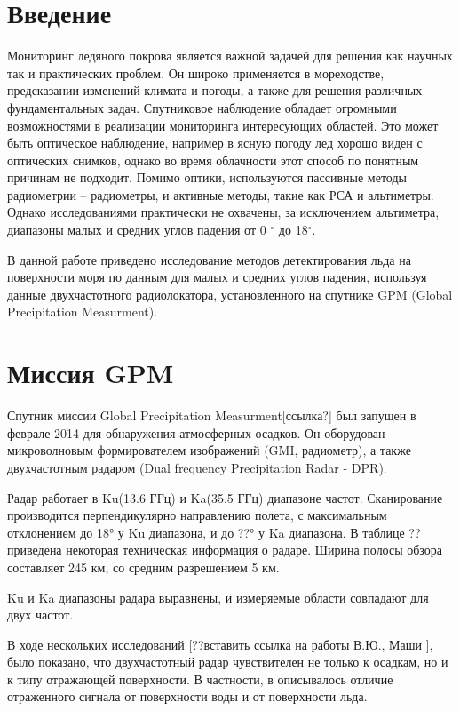 





\tableofcontents
\newpage
\section{Введение}

Мониторинг ледяного покрова является важной задачей для решения как научных так и практических проблем. Он широко
применяется в мореходстве, предсказании изменений климата и погоды, а также для решения различных фундаментальных задач.
Спутниковое наблюдение обладает огромными возможностями в реализации мониторинга интересующих областей.
Это может быть оптическое наблюдение, например в ясную погоду лед хорошо виден с оптических снимков, однако во время
облачности этот способ по понятным причинам не подходит. Помимо оптики, используются пассивные методы радиометрии –
радиометры, и активные методы, такие как РСА и альтиметры. Однако исследованиями практически не охвачены, за исключением
альтиметра, диапазоны малых и средних углов падения от 0 $^{\circ}$ до 18$^{\circ}$.

В данной работе приведено исследование методов детектирования льда на поверхности моря по данным для малых и средних углов падения,
используя данные двухчастотного радиолокатора, установленного на спутнике GPM (Global Precipitation Measurment).


\section{Миссия GPM}
Спутник миссии Global Precipitation Measurment[ссылка?] был запущен в феврале 2014 для обнаружения атмосферных осадков.
Он оборудован микроволновым формирователем изображений (GMI, радиометр), а также двухчастотным радаром (Dual frequency
Precipitation Radar - DPR). 

Радар работает в Ku(13.6 ГГц) и Ka(35.5 ГГц) диапазоне частот. Сканирование производится перпендикулярно направлению
полета, с максимальным отклонением до 18° у Ku диапазона, и до ??° у Ka диапазона. В таблице ?? приведена некоторая
техническая информация о радаре.
Ширина полосы обзора составляет 245 км, со средним разрешением 5 км.

Ku и Ka диапазоны радара выравнены, и измеряемые области совпадают для двух частот.  

В ходе нескольких исследований [??вставить ссылка на работы В.Ю., Маши ], было показано, что двухчастотный радар
чувствителен не только к осадкам, но и к типу отражающей поверхности. В частности, в \cite{kar1} описывалось отличие
отраженного сигнала от поверхности воды и от поверхности льда.


